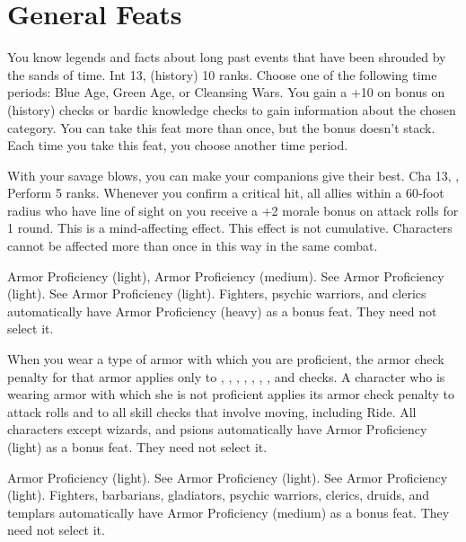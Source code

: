 \section{General Feats}

{You know legends and facts about long past events that have been shrouded by the sands of time.}
{Int 13,  (history) 10 ranks.}
{Choose one of the following time periods: Blue Age, Green Age, or Cleansing Wars. You gain a +10 on bonus on  (history) checks or bardic knowledge checks to gain information about the chosen category.}{}
{You can take this feat more than once, but the bonus doesn't stack. Each time you take this feat, you choose another time period.}

{With your savage blows, you can make your companions give their best.}
{Cha 13, , Perform 5 ranks.}
{Whenever you confirm a critical hit, all allies within a 60‐foot radius who have line of sight on you receive a +2 morale bonus on attack rolls for 1 round. This is a mind‐affecting effect. This effect is not cumulative. Characters cannot be affected more than once in this way in the same combat.}{}{}

{Armor Proficiency (light), Armor Proficiency (medium).}
{See Armor Proficiency (light).}
{See Armor Proficiency (light).}
{Fighters, psychic warriors, and clerics automatically have Armor Proficiency (heavy) as a bonus feat. They need not select it.}

{When you wear a type of armor with which you are proficient, the armor check penalty for that armor applies only to , , , , , , , and  checks.}
{A character who is wearing armor with which she is not proficient applies its armor check penalty to attack rolls and to all skill checks that involve moving, including Ride.}
{All characters except wizards, and psions automatically have Armor Proficiency (light) as a bonus feat. They need not select it.}

{Armor Proficiency (light).}
{See Armor Proficiency (light).}
{See Armor Proficiency (light).}
{Fighters, barbarians, gladiators, psychic warriors, clerics, druids, and templars automatically have Armor Proficiency (medium) as a bonus feat. They need not select it.}

